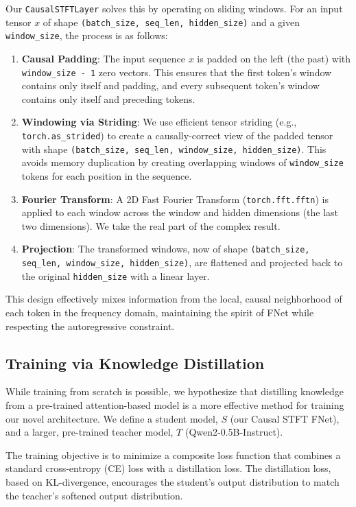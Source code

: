 \documentclass[11pt,a4paper]{article}
\begin{document}
Our \texttt{CausalSTFTLayer} solves this by operating on sliding windows. For an input tensor $x$ of shape \texttt{(batch\_size, seq\_len, hidden\_size)} and a given \texttt{window\_size}, the process is as follows:
\begin{enumerate}
    \item \textbf{Causal Padding}: The input sequence $x$ is padded on the left (the past) with \texttt{window\_size - 1} zero vectors. This ensures that the first token's window contains only itself and padding, and every subsequent token's window contains only itself and preceding tokens.
    \item \textbf{Windowing via Striding}: We use efficient tensor striding (e.g., \texttt{torch.as\_strided}) to create a causally-correct view of the padded tensor with shape \texttt{(batch\_size, seq\_len, window\_size, hidden\_size)}. This avoids memory duplication by creating overlapping windows of \texttt{window\_size} tokens for each position in the sequence.
    \item \textbf{Fourier Transform}: A 2D Fast Fourier Transform (\texttt{torch.fft.fftn}) is applied to each window across the window and hidden dimensions (the last two dimensions). We take the real part of the complex result.
    \item \textbf{Projection}: The transformed windows, now of shape \texttt{(batch\_size, seq\_len, window\_size, hidden\_size)}, are flattened and projected back to the original \texttt{hidden\_size} with a linear layer.
\end{enumerate}
This design effectively mixes information from the local, causal neighborhood of each token in the frequency domain, maintaining the spirit of FNet while respecting the autoregressive constraint.

\subsection{Training via Knowledge Distillation}
While training from scratch is possible, we hypothesize that distilling knowledge from a pre-trained attention-based model is a more effective method for training our novel architecture. We define a student model, $S$ (our Causal STFT FNet), and a larger, pre-trained teacher model, $T$ (Qwen2-0.5B-Instruct).

The training objective is to minimize a composite loss function that combines a standard cross-entropy (CE) loss with a distillation loss. The distillation loss, based on KL-divergence, encourages the student's output distribution to match the teacher's softened output distribution.
\end{document}
